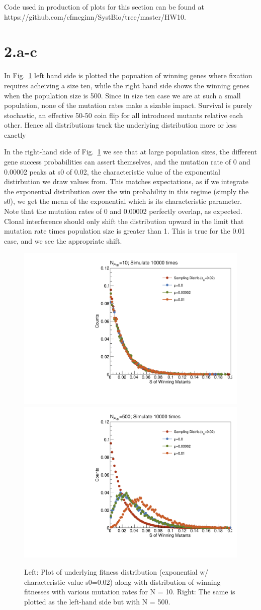 \documentclass{article}
\begin{document}
Code used in production of plots for this section can be found at https://github.com/cfmcginn/SystBio/tree/master/HW10.

\section{2.a-c}

In Fig.~\ref{fig:fig1} left hand side is plotted the popuation of winning genes where fixation requires acheiving a size ten, while the right hand side shows the winning genes when the population size is 500. Since in size ten case we are at such a small population, none of the mutation rates make a sizable impact. Survival is purely stochastic, an effective 50-50 coin flip for all introduced mutants relative each other. Hence all distributions track the underlying distribution more or less exactly

In the right-hand side of Fig.~\ref{fig:fig1} we see that at large population sizes, the different gene success probabilities can assert themselves, and the mutation rate of 0 and 0.00002 peaks at s0 of 0.02, the characteristic value of the exponential distirbution we draw values from. This matches expectations, as if we integrate the exponential distribution over the win probability in this regime (simply the s0), we get the mean of the exponential which is its characteristic parameter. Note that the mutation rates of 0 and 0.00002 perfectly overlap, as expected. Clonal interference should only shift the distribution upward in the limit that mutation rate times population size is greater than 1. This is true for the 0.01 case, and we see the appropriate shift. 

\begin{figure}[H]
    \centering
    \includegraphics[width=.45\textwidth]{plotMoran_NPop10.pdf}
    \includegraphics[width=.45\textwidth]{plotMoran_NPop500.pdf}
    \caption{Left: Plot of underlying fitness distribution (exponential w/ characteristic value s0=0.02) along with distribution of winning fitnesses with various mutation rates for N = 10. Right: The same is plotted as the left-hand side but with N = 500.}
    \label{fig:fig1}
\end{figure}
\end{document}
